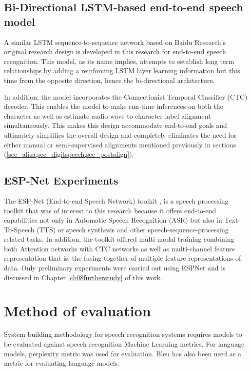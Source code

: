 \subsection{Bi-Directional LSTM-based end-to-end speech model}\label{sec_be2e}
A similar LSTM sequence-to-sequence network based on Baidu Research’s original research design \citep{hannun2014deep} is developed in this research for end-to-end speech recognition.  This model, as its name implies, attempts to establish long term relationships by adding a reinforcing LSTM layer learning information but this time from the opposite direction, hence the bi-directional architecture.  

In addition, the model incorporates the Connectionist Temporal Classifier (CTC) decoder. This enables the model to make run-time inferences on both the character as well as estimate audio wave to character label alignment simultaneously.  This makes this design accommodate end-to-end goals and ultimately simplifies the overall design and completely eliminates the need for either manual or semi-supervised alignments mentioned previously in sections (\ref{sec_alisa,sec_digitspeech,sec_postalign}).

\subsection{ESP-Net Experiments}\label{c3sec_espnet}
The ESP-Net (End-to-end Speech Network) toolkit \citep{watanabe2018espnet}, is a speech processing toolkit that was of interest to this research because it offers end-to-end capabilities not only in Automatic Speech Recognition (ASR) but also in Text-To-Speech (TTS) or speech synthesis and other speech-sequence-processing related tasks.  In addition, the toolkit offered multi-modal training combining both Attention networks \cite{vaswani2017attention} with CTC networks as well as multi-channel feature representation that is, the fusing together of multiple feature representations of data.  Only preliminary experiments were carried out using ESPNet and is discussed in Chapter \ref{ch08furtherstudy} of this work.

\section{Method of evaluation}
System building methodology \citep{nunamaker1990systems} for speech recognition systems requires models to be evaluated against speech recognition Machine Learning metrics.  For language models, perplexity metric was used for evaluation.  Bleu has also been used as a metric for evaluating language models.

